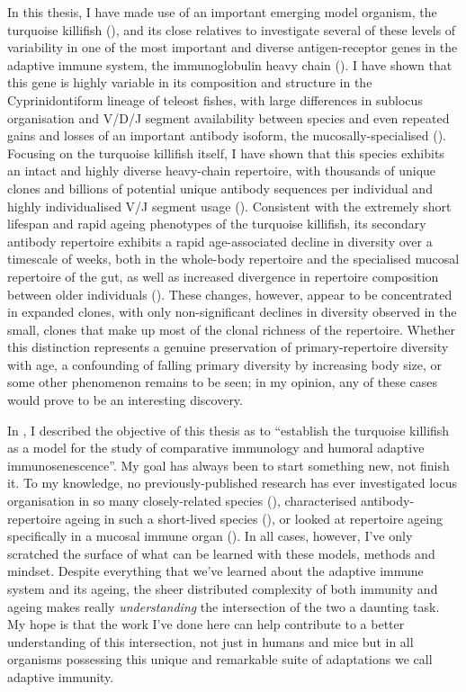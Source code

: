 In this thesis, I have made use of an important emerging model organism, the turquoise killifish (\nfu), and its close relatives to investigate several of these levels of variability in one of the most important and diverse antigen-receptor genes in the adaptive immune system, the immunoglobulin heavy chain (\igh{}). I have shown that this gene is highly variable in its composition and structure in the Cyprinidontiform lineage of teleost fishes, with large differences in sublocus organisation and V/D/J segment availability between species and even repeated gains and losses of an important antibody isoform, the mucosally-specialised  (). Focusing on the turquoise killifish itself, I have shown that this species exhibits an intact and highly diverse heavy-chain repertoire, with thousands of unique clones and billions of potential unique antibody sequences per individual and highly individualised V/J segment usage (). Consistent with the extremely short lifespan and rapid ageing phenotypes of the turquoise killifish, its secondary antibody repertoire exhibits a rapid age-associated decline in diversity over a timescale of weeks, both in the whole-body repertoire and the specialised mucosal repertoire of the gut, as well as increased divergence in repertoire composition between older individuals (). These changes, however, appear to be concentrated in expanded clones, with only non-significant declines in diversity observed in the small, \naive clones that make up most of the clonal richness of the repertoire. Whether this distinction represents a genuine preservation of primary-repertoire diversity with age, a confounding of falling primary diversity by increasing body size, or some other phenomenon remains to be seen; in my opinion, any of these cases would prove to be an interesting discovery.

In , I described the objective of this thesis as to ``establish the turquoise killifish as a model for the study of comparative immunology and humoral adaptive immunosenescence''. My goal has always been to start something new, not finish it. To my knowledge, no previously-published research has ever investigated \igh{} locus organisation in so many closely-related species (), characterised antibody-repertoire ageing in such a short-lived species (), or looked at repertoire ageing specifically in a mucosal immune organ (). In all cases, however, I've only scratched the surface of what can be learned with these models, methods and mindset. Despite everything that we've learned about the adaptive immune system and its ageing, the sheer distributed complexity of both immunity and ageing makes really \textit{understanding} the intersection of the two a daunting task. My hope is that the work I've done here can help contribute to a better understanding of this intersection, not just in humans and mice but in all organisms possessing this unique and remarkable suite of adaptations we call adaptive immunity.